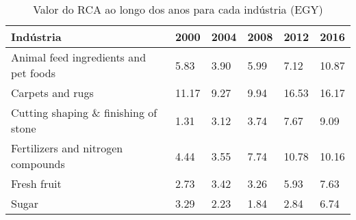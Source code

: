 \begin{table}
\centering
\caption{Valor do RCA ao longo dos anos para cada indústria (EGY)}
\label{tab:ex3-tempo-EGY}
\begin{tabular}{p{6cm}p{1.5cm}p{1.5cm}p{1.5cm}p{1.5cm}p{1.5cm}}
\toprule
                            Indústria &  2000 & 2004 & 2008 &  2012 &  2016 \\
\midrule
Animal feed ingredients and pet foods &  5.83 & 3.90 & 5.99 &  7.12 & 10.87 \\
                     Carpets and rugs & 11.17 & 9.27 & 9.94 & 16.53 & 16.17 \\
 Cutting shaping \& finishing of stone &  1.31 & 3.12 & 3.74 &  7.67 &  9.09 \\
   Fertilizers and nitrogen compounds &  4.44 & 3.55 & 7.74 & 10.78 & 10.16 \\
                          Fresh fruit &  2.73 & 3.42 & 3.26 &  5.93 &  7.63 \\
                                Sugar &  3.29 & 2.23 & 1.84 &  2.84 &  6.74 \\
\bottomrule
\end{tabular}
\end{table}
